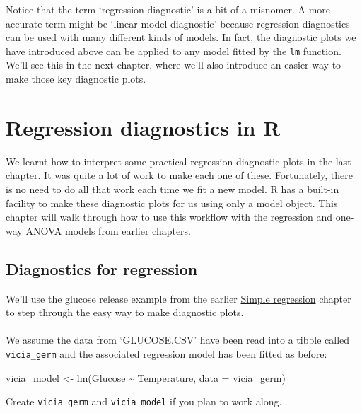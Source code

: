 \documentclass[
]{book}
\newenvironment{Shaded}{\begin{snugshade}}{\end{snugshade}}
\newcommand{\AttributeTok}[1]{\textcolor[rgb]{0.77,0.63,0.00}{#1}}
\newcommand{\FunctionTok}[1]{\textcolor[rgb]{0.00,0.00,0.00}{#1}}
\newcommand{\NormalTok}[1]{#1}
\newcommand{\OtherTok}[1]{\textcolor[rgb]{0.56,0.35,0.01}{#1}}
\newcommand{\SpecialCharTok}[1]{\textcolor[rgb]{0.00,0.00,0.00}{#1}}
\newenvironment{greybox}{
  \definecolor{shadecolor}{rgb}{0.95,0.95,0.95}  %
  \color{black}
  \begin{shaded}}
 {\end{shaded}}
\newenvironment{infobox}[1]
  {
  \begin{itemize}
  \renewcommand{\labelitemi}{
    \raisebox{-.7\height}[0pt][0pt]{
      {\setkeys{Gin}{width=3em,keepaspectratio}
        \texttt{[image: images/\#1]}}
    }
  }
  \setlength{\fboxsep}{1em}
  \begin{greybox}
  \item
  }
  {
  \end{greybox}
  \end{itemize}
  }
\begin{document}
Notice that the term `regression diagnostic' is a bit of a misnomer. A more accurate term might be `linear model diagnostic' because regression diagnostics can be used with many different kinds of models. In fact, the diagnostic plots we have introduced above can be applied to any model fitted by the \texttt{lm} function. We'll see this in the next chapter, where we'll also introduce an easier way to make those key diagnostic plots.

\hypertarget{regression-diagnostics-in-r}{%
\chapter{Regression diagnostics in R}\label{regression-diagnostics-in-r}}

We learnt how to interpret some practical regression diagnostic plots in the last chapter. It was quite a lot of work to make each one of these. Fortunately, there is no need to do all that work each time we fit a new model. R has a built-in facility to make these diagnostic plots for us using only a model object. This chapter will walk through how to use this workflow with the regression and one-way ANOVA models from earlier chapters.

\hypertarget{diagnostics-for-regression}{%
\section{Diagnostics for regression}\label{diagnostics-for-regression}}

We'll use the glucose release example from the earlier \protect\hyperlink{regression-in-R}{Simple regression} chapter to step through the easy way to make diagnostic plots.

\begin{infobox}{action}

\hypertarget{section-15}{%
\subsubsection*{}\label{section-15}}

We assume the data from `GLUCOSE.CSV' have been read into a tibble called \texttt{vicia\_germ} and the associated regression model has been fitted as before:

\begin{Shaded}
\begin{Highlighting}[]
\NormalTok{vicia\_model }\OtherTok{\textless{}{-}} \FunctionTok{lm}\NormalTok{(Glucose }\SpecialCharTok{\textasciitilde{}}\NormalTok{ Temperature, }\AttributeTok{data =}\NormalTok{ vicia\_germ)}
\end{Highlighting}
\end{Shaded}

Create \texttt{vicia\_germ} and \texttt{vicia\_model} if you plan to work along.

\end{infobox}
\end{document}
